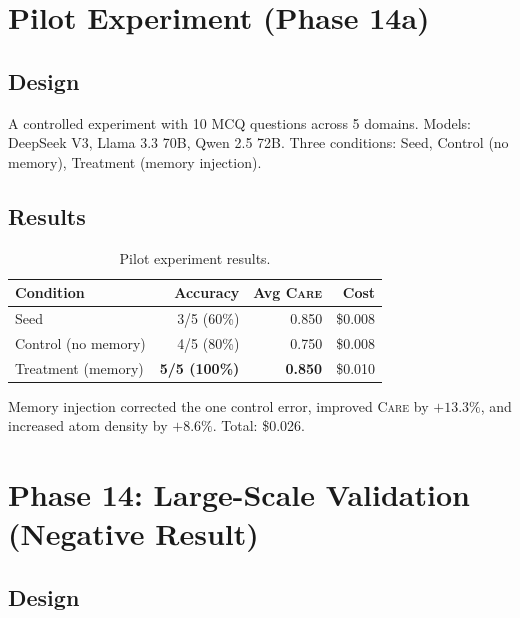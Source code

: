 \documentclass[11pt,a4paper]{article}
\newcommand{\care}{\textsc{Care}\xspace}
\begin{document}
\section{Pilot Experiment (Phase 14a)}\label{sec:pilot}

\subsection{Design}

A controlled experiment with 10 MCQ questions across 5 domains.
Models: DeepSeek V3, Llama 3.3 70B, Qwen 2.5 72B.  Three conditions:
Seed, Control (no memory), Treatment (memory injection).

\subsection{Results}

\begin{table}[H]
\centering\small
\caption{Pilot experiment results.}\label{tab:pilot}
\begin{tabular}{@{}lrrr@{}}
\toprule
\textbf{Condition} & \textbf{Accuracy} & \textbf{Avg \care} &
  \textbf{Cost} \\
\midrule
Seed                  & 3/5 (60\%)       & 0.850 & \$0.008 \\
Control (no memory)   & 4/5 (80\%)       & 0.750 & \$0.008 \\
Treatment (memory)    & \textbf{5/5 (100\%)} & \textbf{0.850} & \$0.010 \\
\bottomrule
\end{tabular}
\end{table}

Memory injection corrected the one control error, improved \care by
$+13.3\%$, and increased atom density by $+8.6\%$.  Total: \$0.026.

\section{Phase 14: Large-Scale Validation (Negative Result)}
\label{sec:phase14}

\subsection{Design}
\end{document}
